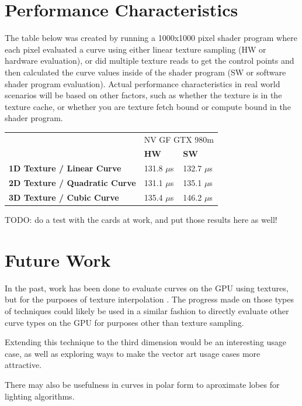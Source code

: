 \documentclass{jcgt}
\begin{document}
\section{Performance Characteristics}
\label{sec:performancecharacteristics}

The table below was created by running a 1000x1000 pixel shader program where each pixel evaluated a curve using either linear texture sampling (HW or hardware evaluation), or did multiple texture reads to get the control points and then calculated the curve values inside of the shader program (SW or software shader program evaluation).  Actual performance characteristics in real world scenarios will be based on other factors, such as whether the texture is in the texture cache, or whether you are texture fetch bound or compute bound in the shader program.

\begin{tabular}{|l|l l|}
\hline
& \multicolumn{2}{|c|}{NV GF GTX 980m} \\
& \bf{HW} & \bf{SW}\\ \hline
\bf{1D Texture / Linear Curve} & 131.8 $\mu$s & 132.7 $\mu$s \\ \hline
\bf{2D Texture / Quadratic Curve} & 131.1 $\mu$s & 135.1 $\mu$s \\ \hline
\bf{3D Texture / Cubic Curve} & 135.4 $\mu$s & 146.2 $\mu$s \\ \hline
\end{tabular}

TODO: do a test with the cards at work, and put those results here as well!

\section*{Future Work}
\label{sec:futurework}

In the past, work has been done to evaluate curves on the GPU using textures, but for the purposes of texture interpolation \cite{doi:10.1080/2151237X.2008.10129269}.  The progress made on those types of techniques could likely be used in a similar fashion to directly evaluate other curve types on the GPU for purposes other than texture sampling.

Extending this technique to the third dimension would be an interesting usage case, as well as exploring ways to make the vector art usage cases more attractive.

There may also be usefulness in curves in polar form to aproximate lobes for lighting algorithms.
\end{document}
